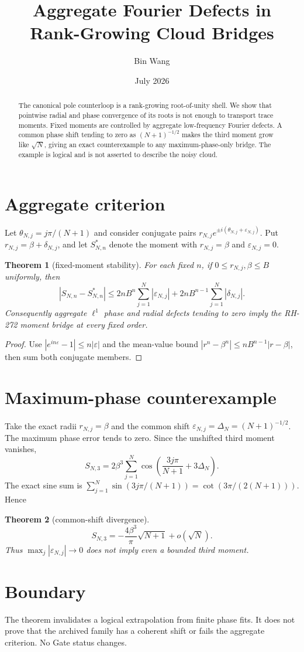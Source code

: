 \documentclass[11pt]{article}
\title{Aggregate Fourier Defects in Rank-Growing Cloud Bridges}\author{Bin Wang}\date{July 2026}
\newtheorem{theorem}{Theorem}[section]\newtheorem{corollary}[theorem]{Corollary}
\theoremstyle{remark}\newtheorem{remark}[theorem]{Remark}
\begin{document}
\maketitle
\begin{abstract}
The canonical pole counterloop is a rank-growing root-of-unity shell.  We
show that pointwise radial and phase convergence of its roots is not enough
to transport trace moments.  Fixed moments are controlled by aggregate
low-frequency Fourier defects.  A common phase shift tending to zero as
$(N+1)^{-1/2}$ makes the third moment grow like $\sqrt N$, giving an exact
counterexample to any maximum-phase-only bridge.  The example is logical and
is not asserted to describe the noisy cloud.
\end{abstract}
\section{Aggregate criterion}
Let $\theta_{N,j}=j\pi/(N+1)$ and consider conjugate pairs
$r_{N,j}e^{\pm i(\theta_{N,j}+\varepsilon_{N,j})}$.  Put
$r_{N,j}=\beta+\delta_{N,j}$, and let $S^*_{N,n}$ denote the moment with
$r_{N,j}=\beta$ and $\varepsilon_{N,j}=0$.
\begin{theorem}[fixed-moment stability]
For each fixed $n$, if $0\le r_{N,j},\beta\le B$ uniformly, then
\[
|S_{N,n}-S^*_{N,n}|
 \le 2nB^n\sum_{j=1}^N|\varepsilon_{N,j}|
 +2nB^{n-1}\sum_{j=1}^N|\delta_{N,j}|.
\]
Consequently aggregate $\ell^1$ phase and radial defects tending to zero
imply the RH-272 moment bridge at every fixed order.
\end{theorem}
\begin{proof}
Use $|e^{in\varepsilon}-1|\le n|\varepsilon|$ and the mean-value bound
$|r^n-\beta^n|\le nB^{n-1}|r-\beta|$, then sum both conjugate members.
\end{proof}
\section{Maximum-phase counterexample}
Take the exact radii $r_{N,j}=\beta$ and the common shift
$\varepsilon_{N,j}=\Delta_N=(N+1)^{-1/2}$.  The maximum phase error tends to
zero.  Since the unshifted third moment vanishes,
\[
 S_{N,3}=2\beta^3\sum_{j=1}^N
 \cos\!\left(\frac{3j\pi}{N+1}+3\Delta_N\right).
\]
The exact sine sum is
$\sum_{j=1}^N\sin(3j\pi/(N+1))=\cot(3\pi/(2(N+1)))$.  Hence
\begin{theorem}[common-shift divergence]
\[
 S_{N,3}=-\frac{4\beta^3}{\pi}\sqrt{N+1}+o(\sqrt N).
\]
Thus $\max_j|\varepsilon_{N,j}|\to0$ does not imply even a bounded third
moment.
\end{theorem}
\section{Boundary}
The theorem invalidates a logical extrapolation from finite phase fits.  It
does not prove that the archived family has a coherent shift or fails the
aggregate criterion.  No Gate status changes.
\end{document}
